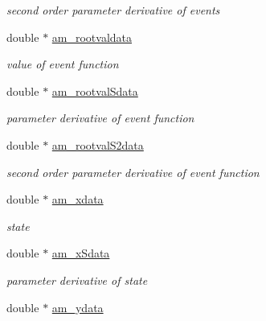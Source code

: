 \begin{DoxyCompactItemize}
\begin{DoxyCompactList}\small\item\em second order parameter derivative of events \end{DoxyCompactList}\item 
\hypertarget{struct_return_data_a4991fdb926d3db2f28c327165d0c11c4}{}double $\ast$ \hyperlink{struct_return_data_a4991fdb926d3db2f28c327165d0c11c4}{am\+\_\+rootvaldata}\label{struct_return_data_a4991fdb926d3db2f28c327165d0c11c4}

\begin{DoxyCompactList}\small\item\em value of event function \end{DoxyCompactList}\item 
\hypertarget{struct_return_data_adc0a319cb427b2ad2fef3f2cbd69d765}{}double $\ast$ \hyperlink{struct_return_data_adc0a319cb427b2ad2fef3f2cbd69d765}{am\+\_\+rootval\+Sdata}\label{struct_return_data_adc0a319cb427b2ad2fef3f2cbd69d765}

\begin{DoxyCompactList}\small\item\em parameter derivative of event function \end{DoxyCompactList}\item 
\hypertarget{struct_return_data_a63a3d2f728c5789c4b93a84ecaf29cfa}{}double $\ast$ \hyperlink{struct_return_data_a63a3d2f728c5789c4b93a84ecaf29cfa}{am\+\_\+rootval\+S2data}\label{struct_return_data_a63a3d2f728c5789c4b93a84ecaf29cfa}

\begin{DoxyCompactList}\small\item\em second order parameter derivative of event function \end{DoxyCompactList}\item 
double $\ast$ \hyperlink{struct_return_data_ad99b08eb835733c2416a1a0004e4a491}{am\+\_\+xdata}
\begin{DoxyCompactList}\small\item\em state \end{DoxyCompactList}\item 
\hypertarget{struct_return_data_a097369567440c923ac24256e75ab3e89}{}double $\ast$ \hyperlink{struct_return_data_a097369567440c923ac24256e75ab3e89}{am\+\_\+x\+Sdata}\label{struct_return_data_a097369567440c923ac24256e75ab3e89}

\begin{DoxyCompactList}\small\item\em parameter derivative of state \end{DoxyCompactList}\item 
\hypertarget{struct_return_data_a24568582aa8de699ea1ce53323ff26ca}{}double $\ast$ \hyperlink{struct_return_data_a24568582aa8de699ea1ce53323ff26ca}{am\+\_\+ydata}\label{struct_return_data_a24568582aa8de699ea1ce53323ff26ca}


\end{DoxyCompactItemize}
